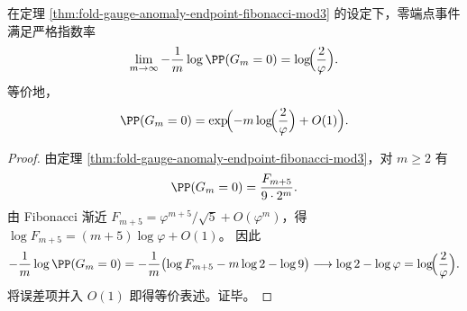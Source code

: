 \begin{corollary}[零规范差端点的指数衰减率]\label{cor:fold-gauge-anomaly-zero-defect-exp-rate}
在定理 \ref{thm:fold-gauge-anomaly-endpoint-fibonacci-mod3} 的设定下，零端点事件满足严格指数率
\[
\lim_{m\to\infty}-\frac1m\log \PP(G_m=0)=\log\!\Bigl(\frac{2}{\varphi}\Bigr).
\]
等价地，
\[
\PP(G_m=0)=\exp\!\Bigl(-m\log\!\Bigl(\frac{2}{\varphi}\Bigr)+O(1)\Bigr).
\]
\end{corollary}
\begin{proof}
由定理 \ref{thm:fold-gauge-anomaly-endpoint-fibonacci-mod3}，对 \(m\ge 2\) 有
\[
\PP(G_m=0)=\frac{F_{m+5}}{9\cdot 2^m}.
\]
由 Fibonacci 渐近 \(F_{m+5}=\varphi^{m+5}/\sqrt5+O(\varphi^{m})\)，得
\(
\log F_{m+5}=(m+5)\log\varphi+O(1)
\)。
因此
\[
-\frac1m\log \PP(G_m=0)
=-\frac1m\bigl(\log F_{m+5}-m\log 2-\log 9\bigr)
\longrightarrow \log 2-\log\varphi
=\log\!\Bigl(\frac{2}{\varphi}\Bigr).
\]
将误差项并入 \(O(1)\) 即得等价表述。证毕。
\end{proof}
